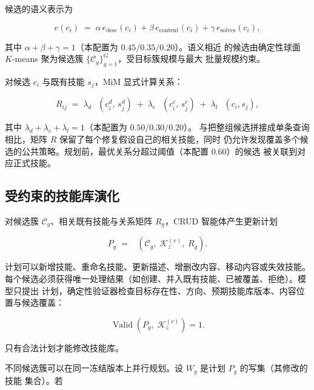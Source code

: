 \documentclass[UTF8,11pt]{ctexart}
\newcommand{\KK}{\mathcal{K}}
\newcommand{\CC}{\mathcal{C}}
\DeclareMathOperator{\Valid}{Valid}
\DeclareMathOperator{\simsem}{sim_{sem}}
\DeclareMathOperator{\simlex}{sim_{lex}}
\DeclareMathOperator{\Crud}{G_{crud}}
\begin{document}
候选的语义表示为

\begin{equation}
\label{eq:cembed}
e(c_i) \;=\; \alpha\, e_{\mathrm{desc}}(c_i) + \beta\, e_{\mathrm{content}}(c_i)
+ \gamma\, e_{\mathrm{solves}}(c_i),
\end{equation}

\noindent 其中 $\alpha + \beta + \gamma = 1$（本配置为 $0.45 / 0.35 / 0.20$）。语义相近
的候选由确定性球面 $K$-means 聚为候选簇 $\{\CC_g\}_{g=1}^{G}$，受目标簇规模与最大
批量规模约束。

对候选 $c_i$ 与既有技能 $s_j$，MiM 显式计算关系：

\begin{equation}
\label{eq:relation}
R_{ij} \;=\; \lambda_d\, \simsem\!\left(c_i^{d},\, s_j^{d}\right)
\;+\; \lambda_c\, \simsem\!\left(c_i^{c},\, s_j^{c}\right)
\;+\; \lambda_l\, \simlex(c_i, s_j),
\end{equation}

\noindent 其中 $\lambda_d + \lambda_c + \lambda_l = 1$（本配置为 $0.50 / 0.30 / 0.20$）。
与把整组候选拼接成单条查询相比，矩阵 $R$ 保留了每个修复假设自己的相关技能，同时
仍允许发现覆盖多个候选的公共策略。规划前，最优关系分超过阈值（本配置 0.60）的候选
被关联到对应正式技能。

\subsection{受约束的技能库演化}
\label{sec:method-evolution}

对候选簇 $\CC_g$、相关既有技能与关系矩阵 $R_g$，CRUD 智能体产生更新计划

\begin{equation}
\label{eq:crud}
P_g \;=\; \Crud\left(\CC_g,\; \KK_z^{(v)},\; R_g\right).
\end{equation}

\noindent 计划可以新增技能、重命名技能、更新描述、增删改内容、移动内容或失效技能。
每个候选必须获得唯一处理结果（如创建、并入既有技能、已被覆盖、拒绝）。模型只提出
计划，确定性验证器检查目标存在性、方向、预期技能库版本、内容位置与候选覆盖：

\begin{equation}
\label{eq:valid}
\Valid(P_g,\; \KK_z^{(v)}) = 1 .
\end{equation}

\noindent 只有合法计划才能修改技能库。

不同候选簇可以在同一冻结版本上并行规划。设 $W_g$ 是计划 $P_g$ 的写集（其修改的技能
集合）。若
\end{document}
